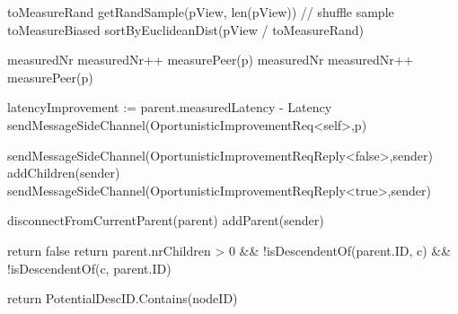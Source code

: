 \begin{algorithm}
\begin{algorithmic}[1]
     \label{alg:memb:passive_view_maint:eval_nodes}
        \State toMeasureRand \asdassign getRandSample(pView, len(pView)) // shuffle sample
        \State toMeasureBiased \asdassign sortByEuclideanDist(pView / toMeasureRand)

        \State measuredNr 
             \label{alg:memb:passive_view_maint:opt_verification_1}
                \State measuredNr++
                \State measurePeer(p)
            \EndIf
        \EndFor
        \State measuredNr 
             \label{alg:memb:passive_view_maint:opt_verification_2}
                \State measuredNr++
                \State measurePeer(p)
            \EndIf
        \EndFor
    \asdend

     \label{alg:memb:passive_view_maint:peer_measured}
        \State latencyImprovement := parent.measuredLatency - Latency
            \State sendMessageSideChannel(OportunisticImprovementReq<self>,p)
        \EndIf
    \asdend

     \label{alg:memb:passive_view_maint:oport_msg_recv}
            \State sendMessageSideChannel(OportunisticImprovementReqReply<false>,sender)
        \Else
            \State addChildren(sender)
            \State sendMessageSideChannel(OportunisticImprovementReqReply<true>,sender)
        \EndIf
    \asdend

     \label{alg:memb:passive_view_maint:op_msg_reply_recv}
            \State disconnectFromCurrentParent(parent)
            \State addParent(sender)
        \EndIf
    \asdend

            \State return false
        \EndIf
        \State return parent.nrChildren > 0 \&\& !isDescendentOf(parent.ID, c) \&\& !isDescendentOf(c, parent.ID)
    \asdend

        \State return PotentialDescID.Contains(nodeID)
    \asdend

\end{algorithmic}
\end{algorithm}